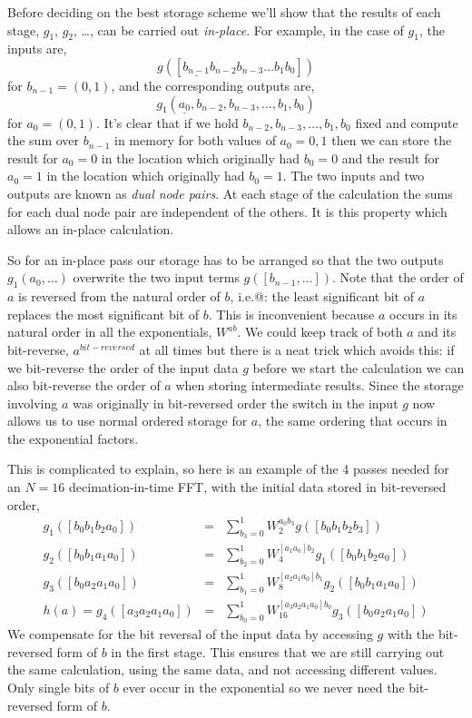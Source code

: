 \documentclass[fleqn,12pt]{article}
\begin{document}
Before deciding on the best storage scheme we'll show that the results
of each stage, $g_1$, $g_2$, \dots, can be carried out {\em
in-place}. For example, in the case of $g_1$, the inputs are,
%
\begin{equation}
g([\underline{b_{n-1}} b_{n-2} b_{n-3} \dots b_1 b_0])
\end{equation}
%
for $b_{n-1}=(0,1)$, and the corresponding outputs are,
%
\begin{equation}
g_1(\underline{a_0},b_{n-2}, b_{n-3}, \dots, b_1, b_0)
\end{equation}
%
for $a_0=(0,1)$.  It's clear that if we hold $b_{n-2}, b_{n-3}, \dots,
b_1, b_0$ fixed and compute the sum over $b_{n-1}$ in memory for both
values of $a_0 = 0,1$ then we can store the result for $a_0=0$ in the
location which originally had $b_0=0$ and the result for $a_0=1$ in
the location which originally had $b_0=1$. The two inputs and two
outputs are known as {\em dual node pairs}. At each stage of the
calculation the sums for each dual node pair are independent of the
others. It is this property which allows an in-place calculation.

So for an in-place pass our storage has to be arranged so that the two
outputs $g_1(a_0,\dots)$ overwrite the two input terms
$g([b_{n-1},\dots])$. Note that the order of $a$ is reversed from the
natural order of $b$, i.e.@: the least significant bit of $a$
replaces the most significant bit of $b$. This is inconvenient
because $a$ occurs in its natural order in all the exponentials,
$W^{ab}$. We could keep track of both $a$ and its bit-reverse,
$a^{\mathit bit-reversed}$ at all times but there is a neat trick
which avoids this: if we bit-reverse the order of the input data $g$
before we start the calculation we can also bit-reverse the order of
$a$ when storing intermediate results. Since the storage involving $a$
was originally in bit-reversed order the switch in the input $g$ now
allows us to use normal ordered storage for $a$, the same ordering
that occurs in the exponential factors.

This is complicated to explain, so here is an example of the 4 passes
needed for an $N=16$ decimation-in-time FFT, with the initial data
stored in bit-reversed order,
%
\begin{eqnarray}
g_1([b_0 b_1 b_2 a_0]) 
&=& 
\sum_{b_3=0}^{1} W_2^{a_0 b_3} g([b_0 b_1 b_2 b_3])
\\
g_2([b_0 b_1 a_1 a_0]) 
&=& 
\sum_{b_2=0}^{1} W_4^{[a_1 a_0] b_2} g_1([b_0 b_1 b_2 a_0])
\\
g_3([b_0 a_2 a_1 a_0]) 
&=& 
\sum_{b_1=0}^{1} W_8^{[a_2 a_1 a_0] b_1} g_2([b_0 b_1 a_1 a_0])
\\
h(a) = g_4([a_3 a_2 a_1 a_0]) 
&=& 
\sum_{b_0=0}^{1} W_{16}^{[a_3 a_2 a_1 a_0] b_0} g_3([b_0 a_2 a_1 a_0])
\end{eqnarray}
%
We compensate for the bit reversal of the input data by accessing $g$
with the bit-reversed form of $b$ in the first stage. This ensures
that we are still carrying out the same calculation, using the same
data, and not accessing different values. Only single bits of $b$ ever
occur in the exponential so we never need the bit-reversed form of
$b$.
\end{document}
